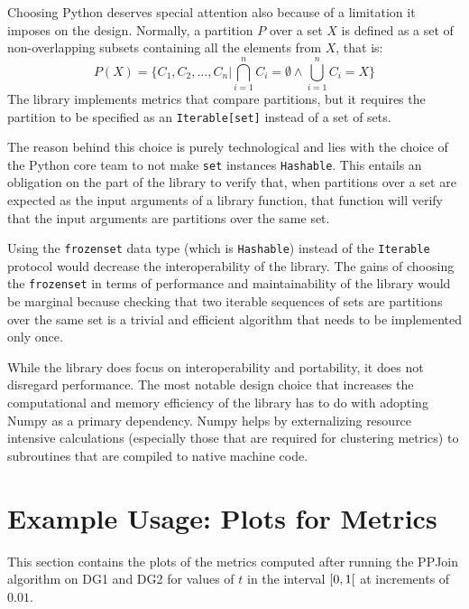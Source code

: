 \documentclass[a4paper,twoside]{article}
\begin{document}
    Choosing Python deserves special attention also because of a limitation it
    imposes on the design.
    Normally, a partition $P$ over a set $X$ is defined as a set of
    non-overlapping subsets containing all the elements from $X$, that is:
    \begin{equation}
        P(X) = \{ C_1, C_2, \ldots, C_n | \bigcap\limits^n_{i=1}C_i=\emptyset \land \bigcup\limits^n_{i=1}C_i=X \}
    \end{equation}
    The library implements metrics that compare partitions, but it requires the
    partition to be specified as an \texttt{Iterable[set]} instead of a set of
    sets.

    The reason behind this choice is purely technological and lies with the
    choice of the Python core team to not make \texttt{set} instances
    \texttt{Hashable}.
    This entails an obligation on the part of the library to verify that, when
    partitions over a set are expected as the input arguments of a library
    function, that function will verify that the input arguments are partitions
    over the same set.

    Using the \texttt{frozenset} data type (which is \texttt{Hashable}) instead
    of the \texttt{Iterable} protocol would decrease the interoperability of the
    library.
    The gains of choosing the \texttt{frozenset} in terms of performance and
    maintainability of the library would be marginal because checking that two
    iterable sequences of sets are partitions over the same set is a trivial and
    efficient algorithm that needs to be implemented only once.

    While the library does focus on interoperability and portability, it does
    not disregard performance.
    The most notable design choice that increases the computational and memory
    efficiency of the library has to do with adopting Numpy as a primary
    dependency.
    Numpy helps by externalizing resource intensive calculations (especially
    those that are required for clustering metrics) to subroutines that are
    compiled to native machine code.

    \section{Example Usage: Plots for Metrics}\label{appendix:sample-figures}
    This section contains the plots of the metrics computed after running the
    PPJoin algorithm on DG1 and DG2 for values of $t$ in the interval
    $\rinterval{0}{1}$ at increments of $0.01$.
\end{document}
